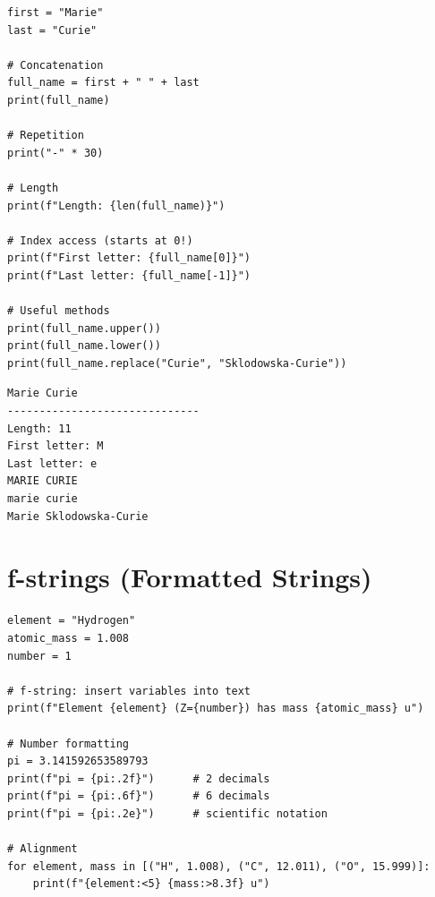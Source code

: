 \begin{codeblock}[title=\textbf{Python --- Strings}]
\begin{verbatim}
first = "Marie"
last = "Curie"

# Concatenation
full_name = first + " " + last
print(full_name)

# Repetition
print("-" * 30)

# Length
print(f"Length: {len(full_name)}")

# Index access (starts at 0!)
print(f"First letter: {full_name[0]}")
print(f"Last letter: {full_name[-1]}")

# Useful methods
print(full_name.upper())
print(full_name.lower())
print(full_name.replace("Curie", "Sklodowska-Curie"))
\end{verbatim}
\end{codeblock}

\begin{codeoutput}
\begin{verbatim}
Marie Curie
------------------------------
Length: 11
First letter: M
Last letter: e
MARIE CURIE
marie curie
Marie Sklodowska-Curie
\end{verbatim}
\end{codeoutput}

\begin{center}
\end{center}

\section{f-strings (Formatted Strings)}

\begin{codeblock}[title=\textbf{Python --- f-strings}]
\begin{verbatim}
element = "Hydrogen"
atomic_mass = 1.008
number = 1

# f-string: insert variables into text
print(f"Element {element} (Z={number}) has mass {atomic_mass} u")

# Number formatting
pi = 3.141592653589793
print(f"pi = {pi:.2f}")      # 2 decimals
print(f"pi = {pi:.6f}")      # 6 decimals
print(f"pi = {pi:.2e}")      # scientific notation

# Alignment
for element, mass in [("H", 1.008), ("C", 12.011), ("O", 15.999)]:
    print(f"{element:<5} {mass:>8.3f} u")
\end{verbatim}
\end{codeblock}

